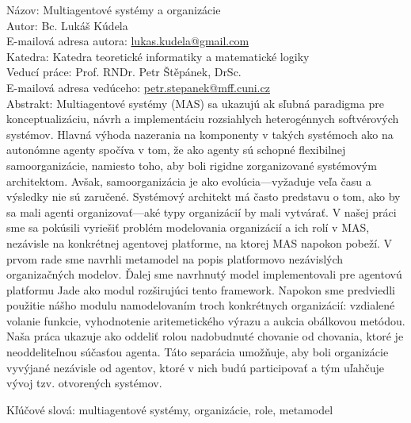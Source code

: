 
\frenchspacing

Názov: Multiagentové systémy a organizácie\\
Autor: Bc. Lukáš Kúdela\\
E-mailová adresa autora: \url{lukas.kudela@gmail.com}\\
Katedra: Katedra teoretické informatiky a matematické logiky\\
Veducí práce: Prof. RNDr. Petr Štěpánek, DrSc.\\
E-mailová adresa vedúceho: \url{petr.stepanek@mff.cuni.cz}\\

Abstrakt: Multiagentové systémy (MAS) sa ukazujú ak sľubná paradigma pre konceptualizáciu, návrh a implementáciu rozsiahlych heterogénnych softvérových systémov.
Hlavná výhoda nazerania na komponenty v takých systémoch ako na autonómne agenty spočíva v tom, že ako agenty sú schopné flexibilnej samoorganizácie, namiesto toho, aby boli rigidne zorganizované systémovým architektom.
Avšak, samoorganizácia je ako evolúcia---vyžaduje veľa času a výsledky nie sú zaručené.
Systémový architekt má často predstavu o tom, ako by sa mali agenti organizovať---aké typy organizácií by mali vytvárať.
V našej práci sme sa pokúsili vyriešiť problém modelovania organizácií a ich rolí v MAS, nezávisle na konkrétnej agentovej platforme, na ktorej MAS napokon pobeží.
V prvom rade sme navrhli metamodel na popis platformovo nezávislých organizačných modelov.
Ďalej sme navrhnutý model implementovali pre agentovú platformu Jade ako modul rozširujúci tento framework.
Napokon sme predviedli použitie nášho modulu namodelovaním troch konkrétnych organizácií: vzdialené volanie funkcie, vyhodnotenie aritemetického výrazu a aukcia obálkovou metódou. 
Naša práca ukazuje ako oddeliť rolou nadobudnuté chovanie od chovania, ktoré je neoddeliteľnou súčasťou agenta.
Táto separácia umožňuje, aby boli organizácie vyvýjané nezávisle od agentov, ktoré v nich budú participovať a tým uľahčuje vývoj tzv. otvorených systémov.

Kľúčové slová: multiagentové systémy, organizácie, role, metamodel

\nonfrenchspacing